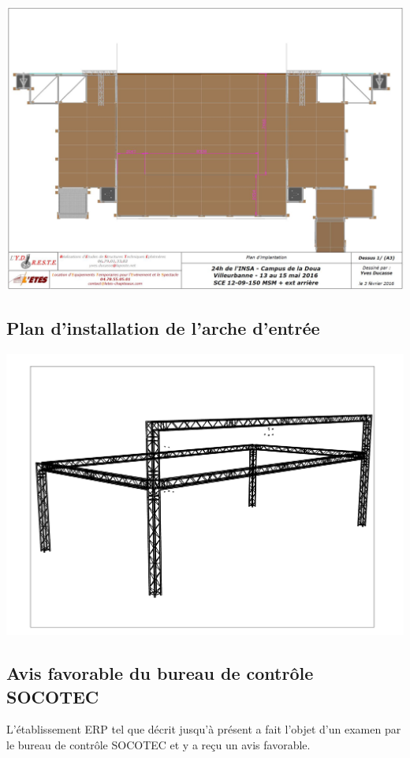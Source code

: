\documentclass[hidelinks, paper=a4, fontsize=13pt]{report}
\begin{document}
\begin{center}
	\includegraphics[scale=0.45, angle=90]{Annexes/Images/scene3}
\end{center}

\subsection{Plan d’installation de l'arche d’entrée}

\begin{center}
	\includegraphics[scale=0.6, angle=90]{Annexes/Images/ArcheEntrees}
\end{center}


\subsection{Avis favorable du bureau de contrôle SOCOTEC}
L'établissement ERP tel que décrit jusqu'à présent a fait l'objet d'un examen par le bureau de contrôle SOCOTEC et y a reçu un avis favorable.
\end{document}
